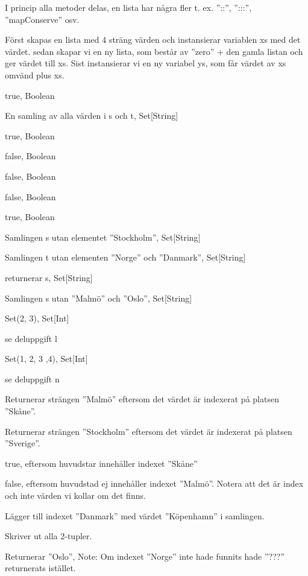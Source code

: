 \Task %

\Subtask 
I princip alla metoder delas, en lista har några fler t. ex. ''::'', '':::'', ''mapConserve'' osv.

\Subtask 
Först skapas en lista med 4 sträng värden och instansierar variablen xs med det värdet.
sedan skapar vi en ny lista, som består av ''zero'' + den gamla listan och ger värdet till xs.
Sist instansierar vi en ny variabel ys, som får värdet av xs omvänd plus xs.

\Task %

\Subtask 
true, Boolean

\Subtask 
En samling av alla värden i s och t, Set[String]

\Subtask 
true, Boolean

\Subtask 
false, Boolean

\Subtask 
false, Boolean

\Subtask 
false, Boolean

\Subtask 
true, Boolean

\Subtask 
Samlingen s utan elementet ''Stockholm'', Set[String]

\Subtask 
Samlingen t utan elementen ''Norge'' och ''Danmark'', Set[String]

\Subtask 
returnerar s, Set[String]

\Subtask 
Samlingen s utan ''Malmö'' och ''Oslo'', Set[String]

\Subtask 
Set(2, 3), Set[Int]

\Subtask 
se deluppgift l

\Subtask 
Set(1, 2, 3 ,4), Set[Int]

\Subtask 
se deluppgift n

\Task %

\Subtask 
Returnerar strängen ''Malmö'' eftersom det värdet är indexerat på platsen ''Skåne''.

\Subtask 
Returnerar strängen ''Stockholm'' eftersom det värdet är indexerat på platsen ''Sverige''.

\Subtask 
true, eftersom huvudstar innehåller indexet ''Skåne''

\Subtask 
false, eftersom huvudstad ej innehåller indexet ''Malmö''. Notera att det är index och inte värden vi 
kollar om det finns.

\Subtask 
Lägger till indexet ''Danmark'' med värdet ''Köpenhamn'' i samlingen.

\Subtask 
Skriver ut alla 2-tupler.

\Subtask 
Returnerar ''Oslo'', Note: Om indexet ''Norge'' inte hade funnits hade ''???'' returnerats istället.

